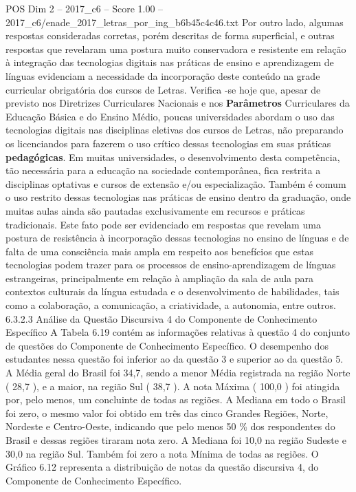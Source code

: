 \begin{textsample}{POS Dim 2 – 2017\_c6 – Score 1.00 – 2017\_c6/enade\_2017\_letras\_por\_ing\_b6b45c4c46.txt}
Por outro lado, algumas respostas consideradas corretas, porém descritas de forma superficial, e outras respostas que revelaram uma postura muito conservadora e resistente em relação à integração das tecnologias digitais nas práticas de ensino e aprendizagem de línguas evidenciam a necessidade da incorporação deste conteúdo na grade curricular obrigatória dos cursos de Letras.
Verifica -se hoje que, apesar de previsto nos Diretrizes Curriculares Nacionais e nos \textbf{Parâmetros} Curriculares da Educação Básica e do Ensino Médio, poucas universidades abordam o uso das tecnologias digitais nas disciplinas eletivas dos cursos de Letras, não preparando os licenciandos para fazerem o uso crítico dessas tecnologias em suas práticas \textbf{pedagógicas}.
Em muitas universidades, o desenvolvimento desta competência, tão necessária para a educação na sociedade contemporânea, fica restrita a disciplinas optativas e cursos de extensão e/ou especialização.
Também é comum o uso restrito dessas tecnologias nas práticas de ensino dentro da graduação, onde muitas aulas ainda são pautadas exclusivamente em recursos e práticas tradicionais.
Este fato pode ser evidenciado em respostas que revelam uma postura de resistência à incorporação dessas tecnologias no ensino de línguas e de falta de uma consciência mais ampla em respeito aos benefícios que estas tecnologias podem trazer para os processos de ensino-aprendizagem de línguas estrangeiras, principalmente em relação à ampliação da sala de aula para contextos culturais da língua estudada e o desenvolvimento de habilidades, tais como a colaboração, a comunicação, a criatividade, a autonomia, entre outros. 6.3.2.3 Análise da Questão Discursiva 4 do Componente de Conhecimento Específico A Tabela 6.19 contém as informações relativas à questão 4 do conjunto de questões do Componente de Conhecimento Específico.
O desempenho dos estudantes nessa questão foi inferior ao da questão 3 e superior ao da questão 5.
A Média geral do Brasil foi 34,7, sendo a menor Média registrada na região Norte ( 28,7 ), e a maior, na região Sul ( 38,7 ).
A nota Máxima ( 100,0 ) foi atingida por, pelo menos, um concluinte de todas as regiões.
A Mediana em todo o Brasil foi zero, o mesmo valor foi obtido em três das cinco Grandes Regiões, Norte, Nordeste e Centro-Oeste, indicando que pelo menos 50 \% dos respondentes do Brasil e dessas regiões tiraram nota zero.
A Mediana foi 10,0 na região Sudeste e 30,0 na região Sul.
Também foi zero a nota Mínima de todas as regiões.
O Gráfico 6.12 representa a distribuição de notas da questão discursiva 4, do Componente de Conhecimento Específico.

\end{textsample}
